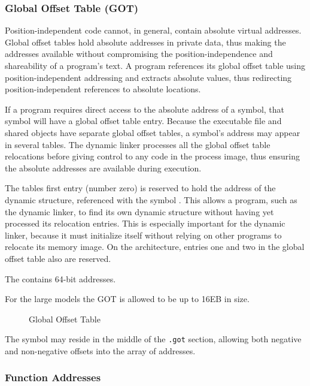 \subsubsection{Global Offset Table (GOT)}
\label{got}

Position-independent code cannot, in general, contain absolute virtual
addresses. Global offset tables hold absolute addresses in private
data, thus making the addresses available without compromising the
position-independence and shareability of a program's text. A program
references its global offset table using position-independent
addressing and extracts absolute values, thus redirecting
position-independent references to absolute locations.
 
If a program requires direct access to the absolute address of a
symbol, that symbol will have a global offset table entry. Because
the executable file and shared objects have separate global offset
tables, a symbol's address may appear in several tables. The dynamic
linker processes all the global offset table relocations before giving
control to any code in the process image, thus ensuring the absolute
addresses are available during execution.

The tables first entry (number zero) is reserved to hold the address
of the dynamic
structure, referenced with the symbol . This allows a
program, such as the dynamic linker, to find its own dynamic structure
without having yet processed its relocation entries. This is
especially important for the dynamic linker, because it must
initialize itself without relying on other programs to relocate its
memory image. On the \xARCH architecture, entries one and two in the
global offset table also are reserved. 

The  contains 64-bit addresses.

For the large models the GOT is allowed to be up to 16EB in size.

\begin{figure}[H]
\Hrule
\caption{Global Offset Table}
\begin{center}
\end{center}
\Hrule
\end{figure}

The symbol  may reside in the
middle of the {\tt .got} section, allowing both negative and
non-negative offsets into the array of addresses.

\subsubsection{Function Addresses}
\label{function_addresses}

